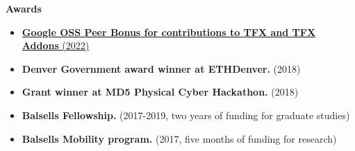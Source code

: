 \documentclass[letterpaper,10pt]{article}
\makeatletter
\newcommand{\resitem}[1]{\item #1 \vspace{-2pt}}
\newcommand{\resheading}[1]{{\large \colorbox{mygrey}{\begin{minipage}{\textwidth}{\textbf{#1 \vphantom{p\^{E}}}}\end{minipage}}}}
\newcommand{\ressubheading}[4]{
\begin{tabular*}{7.0in}{l@{\extracolsep{\fill}}r}
		\textbf{#1} & \textit{#4} \\
\end{tabular*}\vspace{-6pt}}
\makeatother
\begin{document}
	

\resheading{Awards}
	\begin{itemize}
		\resitem{\href{https://opensource.googleblog.com/2022/03/Announcing-First-Group-of-Google-Open-Source-Peer-Bonus-Winners-in-2022.html}{\textbf{Google OSS Peer Bonus for contributions to TFX and TFX Addons} (2022)}}
		\resitem{\textbf{Denver Government award winner at ETHDenver.} (2018)}
		\resitem{\textbf{Grant winner at MD5 Physical Cyber Hackathon.} (2018)}
		\resitem{\textbf{Balsells Fellowship.} (2017-2019, two years of funding for graduate studies)}
		\resitem{\textbf{Balsells Mobility program.} (2017, five months of funding for research)}
	\end{itemize}
\end{document}
